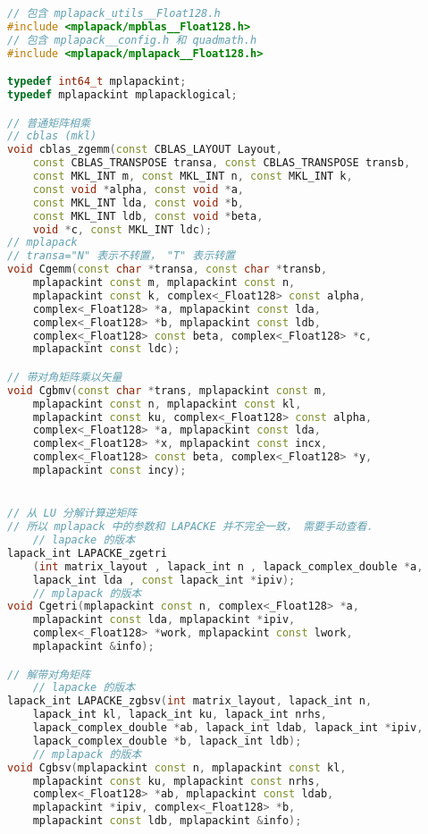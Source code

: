\begin{lstlisting}[language=cpp]
// 包含 mplapack_utils__Float128.h
#include <mplapack/mpblas__Float128.h>
// 包含 mplapack__config.h 和 quadmath.h
#include <mplapack/mplapack__Float128.h>

typedef int64_t mplapackint;
typedef mplapackint mplapacklogical;

// 普通矩阵相乘
// cblas (mkl)
void cblas_zgemm(const CBLAS_LAYOUT Layout,
    const CBLAS_TRANSPOSE transa, const CBLAS_TRANSPOSE transb,
    const MKL_INT m, const MKL_INT n, const MKL_INT k,
    const void *alpha, const void *a,
    const MKL_INT lda, const void *b,
    const MKL_INT ldb, const void *beta,
    void *c, const MKL_INT ldc);
// mplapack
// transa="N" 表示不转置， "T" 表示转置
void Cgemm(const char *transa, const char *transb,
    mplapackint const m, mplapackint const n,
    mplapackint const k, complex<_Float128> const alpha,
    complex<_Float128> *a, mplapackint const lda,
    complex<_Float128> *b, mplapackint const ldb,
    complex<_Float128> const beta, complex<_Float128> *c,
    mplapackint const ldc);

// 带对角矩阵乘以矢量
void Cgbmv(const char *trans, mplapackint const m,
    mplapackint const n, mplapackint const kl,
    mplapackint const ku, complex<_Float128> const alpha,
    complex<_Float128> *a, mplapackint const lda,
    complex<_Float128> *x, mplapackint const incx,
    complex<_Float128> const beta, complex<_Float128> *y,
    mplapackint const incy);


// 从 LU 分解计算逆矩阵
// 所以 mplapack 中的参数和 LAPACKE 并不完全一致， 需要手动查看．
    // lapacke 的版本
lapack_int LAPACKE_zgetri
    (int matrix_layout , lapack_int n , lapack_complex_double *a,
    lapack_int lda , const lapack_int *ipiv);
    // mplapack 的版本
void Cgetri(mplapackint const n, complex<_Float128> *a,
    mplapackint const lda, mplapackint *ipiv,
    complex<_Float128> *work, mplapackint const lwork,
    mplapackint &info);

// 解带对角矩阵
    // lapacke 的版本
lapack_int LAPACKE_zgbsv(int matrix_layout, lapack_int n,
    lapack_int kl, lapack_int ku, lapack_int nrhs,
    lapack_complex_double *ab, lapack_int ldab, lapack_int *ipiv,
    lapack_complex_double *b, lapack_int ldb);
    // mplapack 的版本
void Cgbsv(mplapackint const n, mplapackint const kl,
    mplapackint const ku, mplapackint const nrhs,
    complex<_Float128> *ab, mplapackint const ldab,
    mplapackint *ipiv, complex<_Float128> *b,
    mplapackint const ldb, mplapackint &info);
\end{lstlisting}
